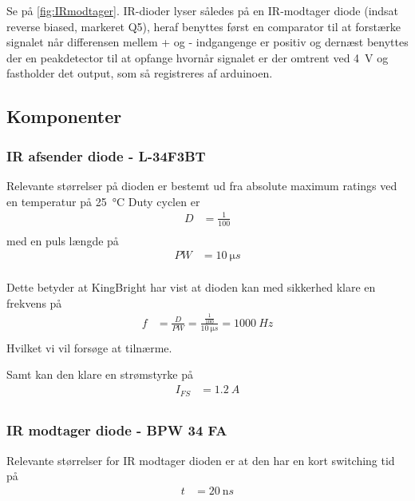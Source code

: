 Se på \ref{fig:IRmodtager}. IR-dioder lyser således på en IR-modtager diode (indsat reverse biased, markeret Q5), heraf benyttes først en comparator til at forstærke signalet når differensen mellem + og - indgangenge er positiv og dernæst benyttes der en peakdetector til at opfange hvornår signalet er der omtrent ved \SI{4}{V} og fastholder det output, som så registreres af arduinoen.


\subsection{Komponenter}
\subsubsection{IR afsender diode - L-34F3BT} \label{subs:IRafsenderKomp}

Relevante størrelser på dioden \cite{kompIRafsender} er bestemt ud fra absolute maximum ratings ved en temperatur på \SI{25}{\celsius} 
Duty cyclen er
\begin{align}
	D &= \frac{1}{100} \\
\end{align}
med en puls længde på 
\begin{align}
	PW &= \SI{10}{\micro s} \\
\end{align}

Dette betyder at KingBright har vist at dioden kan med sikkerhed klare en frekvens på
\begin{align}
	f &=  \frac{D}{PW} =  \frac{\frac{1}{100}}{\SI{10}{\micro s}} = \SI{1000}{Hz}\label{eq:oensketFrekvens}\\ 
\end{align}
Hvilket vi vil forsøge at tilnærme.

Samt kan den klare en strømstyrke på 
\begin{align}
	I_{FS} &= \SI{1.2}{A} \\
\end{align}

\subsubsection{IR modtager diode - BPW 34 FA}
Relevante størrelser for IR modtager dioden \cite{kompIRmodtager} er at den har en kort switching tid på
\begin{align}
	t &= \SI{20}{\nano s} \\
\end{align}

